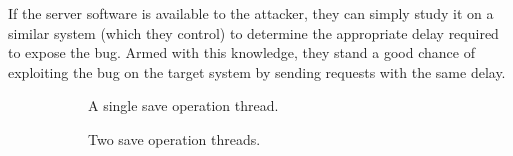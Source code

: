 If the server software is available to the attacker, they can simply study it on a similar system (which they control) to determine the appropriate delay required to expose the bug.
Armed with this knowledge, they stand a good chance of exploiting the bug on the target system by sending requests with the same delay.
\begin{figure}
	\centering
	\begin{subfigure}{\columnwidth}
		\caption{A single save operation thread.}
		\label{fig_save_op}
	\end{subfigure}
	\begin{subfigure}{\columnwidth}
		\caption{Two save operation threads.}
		\label{fig_two_threads}
	\end{subfigure}
	\begin{subfigure}{\columnwidth}

\end{subfigure}
\end{figure}
